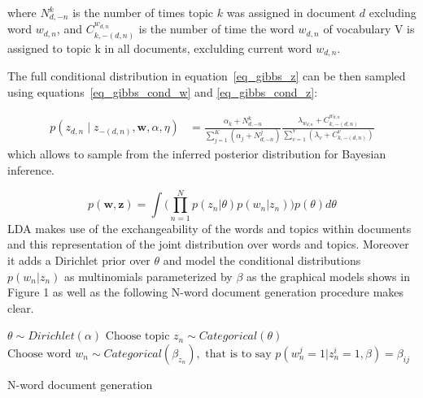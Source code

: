 \documentclass[12pt,a4paper,onecolumn]{article}
\begin{document}
where \(N_{d,-n}^k\) is the number of times topic \(k\) was assigned in document \(d\) excluding word \(w_{d,n}\), and \(C_{k,-(d,n)}^{w_{d,n}}\) is the number of time the word \(w_{d,n}\) of vocabulary V is assigned to topic k in all documents, exclulding current word \(w_{d,n}\).

The full conditional distribution in equation~\eqref{eq_gibbs_z} can be then sampled using equations~\eqref{eq_gibbs_cond_w} and \eqref{eq_gibbs_cond_z}:

\begin{align}
	p(z_{d,n} \mid z_{-(d,n)}, \bm{w}, \alpha, \eta) &= \frac{\alpha_k + N_{d,-n}^k}{\sum_{j=1}^K \left(\alpha_j + N_{d,-n}^j\right)}\frac{\lambda_{w_{d,n}} + C_{k,-(d,n)}^{w_{d,n}}}{\sum_{v=1}^V\left(\lambda_v + C_{k,-(d,n)}^{v}\right)}
\end{align}
which allows to sample from the inferred posterior distribution for Bayesian inference.



\newpage
%

$$p(\mathbf{w}, \mathbf{z})=\int \Big(\prod_{n=1}^N p(z_n|\theta)p(w_n|z_n)\Big)p(\theta)d\theta$$
LDA makes use of the exchangeability of the words and topics within documents and this representation of the joint distribution over words and topics. Moreover it adds a Dirichlet prior over $\theta$ and model the conditional distributions $p(w_n|z_n)$ as multinomials parameterized by $\beta$ as the graphical models shows in Figure 1 as well as the following N-word document generation procedure makes clear.

\begin{algorithm}
	\begin{algorithmic}
		\State $\theta \sim Dirichlet(\alpha)$
		\State $\text{Choose topic } z_n \sim Categorical(\theta)$
		\State $\text{Choose word }w_n \sim Categorical(\beta_{z_n}), \text{ that is to say }p(w_n^j=1|z_n^i=1,\beta)=\beta_{ij}$
		\EndFor
	\end{algorithmic}
	\caption{N-word document generation}
	\label{alg:doc}
\end{algorithm}
\end{document}
